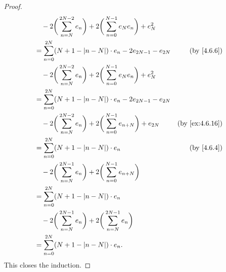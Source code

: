 \begin{proof}
\begin{align*}
     & \quad - 2 \bigg(\sum_{n = N}^{2N - 2} e_n\bigg) + 2 \bigg(\sum_{n = 0}^{N - 1} e_N e_n\bigg) + e_N^2                                             \\
     & = \sum_{n = 0}^{2N} (N + 1 - \abs{n - N}) \cdot e_n - 2 e_{2N - 1} - e_{2N}                                       & \text{(by \cref{4.6.6})}     \\
     & \quad - 2 \bigg(\sum_{n = N}^{2N - 2} e_n\bigg) + 2 \bigg(\sum_{n = 0}^{N - 1} e_N e_n\bigg) + e_N^2                                             \\
     & = \sum_{n = 0}^{2N} (N + 1 - \abs{n - N}) \cdot e_n - 2 e_{2N - 1} - e_{2N}                                                                      \\
     & \quad - 2 \bigg(\sum_{n = N}^{2N - 2} e_n\bigg) + 2 \bigg(\sum_{n = 0}^{N - 1} e_{n + N}\bigg) + e_{2N}           & \text{(by \cref{ex:4.6.16})} \\
     & = \sum_{n = 0}^{2N} (N + 1 - \abs{n - N}) \cdot e_n                                                               & \text{(by \cref{4.6.4})}     \\
     & \quad - 2 \bigg(\sum_{n = N}^{2N - 1} e_n\bigg) + 2 \bigg(\sum_{n = 0}^{N - 1} e_{n + N}\bigg)                                                   \\
     & = \sum_{n = 0}^{2N} (N + 1 - \abs{n - N}) \cdot e_n                                                                                              \\
     & \quad - 2 \bigg(\sum_{n = N}^{2N - 1} e_n\bigg) + 2 \bigg(\sum_{n = N}^{2N - 1} e_n\bigg)                                                        \\
     & = \sum_{n = 0}^{2N} (N + 1 - \abs{n - N}) \cdot e_n.
  \end{align*}
  This closes the induction.


\end{proof}
